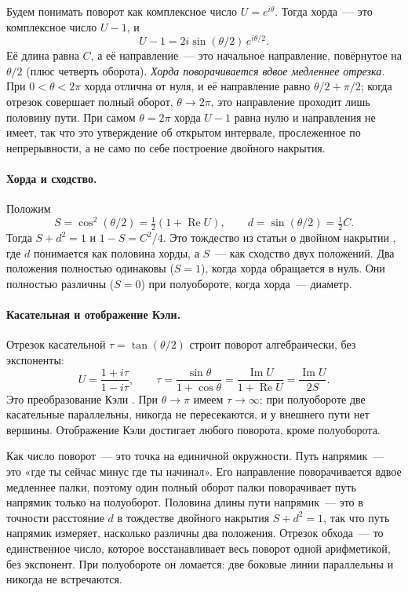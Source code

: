Будем понимать поворот как комплексное число $U=e^{i\theta}$. Тогда хорда~--- это комплексное
число $U-1$, и
\[
U-1=2i\sin(\theta/2)\,e^{i\theta/2}.
\]
Её длина равна $C$, а её направление~--- это начальное направление, повёрнутое на $\theta/2$ (плюс
четверть оборота). \emph{Хорда поворачивается вдвое медленнее отрезка.} При $0<\theta<2\pi$ хорда отлична от нуля, и
её направление равно $\theta/2+\pi/2$; когда отрезок совершает полный оборот, $\theta\to2\pi$, это направление проходит лишь половину пути.
При самом $\theta=2\pi$ хорда $U-1$ равна нулю и направления не имеет, так что это утверждение об открытом интервале,
прослеженное по непрерывности, а не само по себе построение двойного накрытия.

\paragraph{Хорда и сходство.} Положим
\[
S=\cos^2(\theta/2)=\tfrac12(1+\operatorname{Re}U),\qquad d=\sin(\theta/2)=\tfrac12 C.
\]
Тогда $S+d^2=1$ и $1-S=C^2/4$. Это тождество из статьи о двойном накрытии
\cite{davis-dc}, где $d$ понимается как половина хорды, а $S$~--- как сходство двух
положений. Два положения полностью одинаковы ($S=1$), когда хорда обращается в нуль. Они
полностью различны ($S=0$) при полуобороте, когда хорда~--- диаметр.

\paragraph{Касательная и отображение Кэли.} Отрезок касательной $\tau=\tan(\theta/2)$ строит
поворот алгебраически, без экспоненты:
\[
U=\frac{1+i\tau}{1-i\tau},\qquad
\tau=\frac{\sin\theta}{1+\cos\theta}=\frac{\operatorname{Im}U}{1+\operatorname{Re}U}=
\frac{\operatorname{Im}U}{2S}.
\]
Это преобразование Кэли \cite{cayley}. При $\theta\to\pi$ имеем $\tau\to\infty$: при
полуобороте две касательные параллельны, никогда не пересекаются, и у внешнего пути нет
вершины. Отображение Кэли достигает любого поворота, кроме полуоборота.

\begin{plain}
Как число поворот~--- это точка на единичной окружности. Путь напрямик~--- это «где ты
сейчас минус где ты начинал». Его направление поворачивается вдвое медленнее палки, поэтому
один полный оборот палки поворачивает путь напрямик только на полуоборот. Половина длины
пути напрямик~--- это в точности расстояние $d$ в тождестве двойного накрытия $S+d^2=1$, так
что путь напрямик измеряет, насколько различны два положения. Отрезок обхода~--- то
единственное число, которое восстанавливает весь поворот одной арифметикой, без экспонент.
При полуобороте он ломается: две боковые линии параллельны и никогда не встречаются.
\end{plain}

